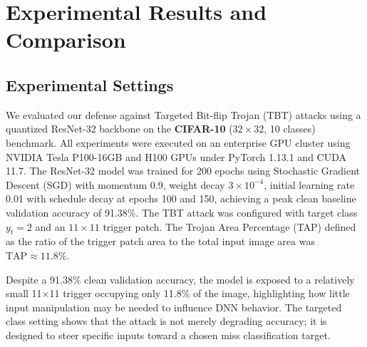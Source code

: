 \documentclass[conference,10pt]{IEEEtran}
\begin{document}
\section{Experimental Results and Comparison}

\subsection{Experimental Settings}
We evaluated our defense against Targeted Bit-flip Trojan (TBT) attacks using a quantized ResNet-32 backbone on the \textbf{CIFAR-10} ($32 \times 32$, 10 classes) benchmark. All experiments were executed on an enterprise GPU cluster using NVIDIA Tesla P100-16GB and H100 GPUs under PyTorch 1.13.1 and CUDA 11.7. 
The ResNet-32 model was trained for 200 epochs using Stochastic Gradient Descent (SGD) with momentum 0.9, weight decay $3 \times 10^{-4}$, initial learning rate 0.01 with schedule decay at epochs 100 and 150, achieving a peak clean baseline validation accuracy of 91.38\%. The TBT attack was configured with target class $y_t = 2$ and an $11 \times 11$ trigger patch. The Trojan Area Percentage (TAP) defined as the ratio of the trigger patch area to the total input image area was $\text{TAP} \approx 11.8\%$.

Despite a 91.38\% clean validation accuracy, the model is exposed to a relatively small 11×11 trigger occupying only 11.8\% of the image, highlighting how little input manipulation may be needed to influence DNN behavior. The targeted class setting shows that the attack is not merely degrading accuracy; it is designed to steer specific inputs toward a chosen miss classification target.
\end{document}

